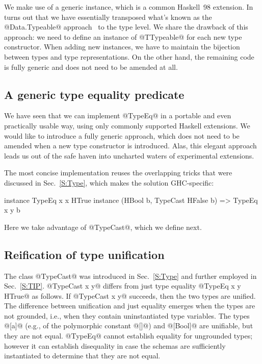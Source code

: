 \documentclass[nocopyrightspace,preprint]{sigplan-proc}
\newcommand{\hwVsTr}[2]{#2}
\begin{document}
We make use of a generic instance, which is a common Haskell~98
extension. In turns out that we have essentially transposed what's
known as the @Data.Typeable@ approach~\cite{LPJ03} to the type
level. We share the drawback of this approach: we need to define an
instance of @TTypeable@ for each new type constructor. When adding new
instances, we have to maintain the bijection between types and type
representations. On the other hand, the remaining code is fully generic
and does not need to be amended at all.


\medskip

\subsection*{A generic type equality predicate}

We have seen that we can implement @TypeEq@ in a portable and even
practically usable way, using only commonly supported Haskell
extensions. We would like to introduce a fully generic approach, which
does not need to be amended when a new type constructor is
introduced. Alas, this elegant approach leads us out of the safe haven
into uncharted waters of experimental extensions.

The most concise implementation reuses the overlapping tricks that
were discussed in Sec.~\ref{S:Type}, which makes the solution
GHC-specific:

\begin{code}
 instance TypeEq x x HTrue
 instance (HBool b, TypeCast HFalse b)
      =>  TypeEq x y b
\end{code}

Here we take advantage of @TypeCast@, which we define next.


\medskip

\subsection*{Reification of type unification}

The class @TypeCast@ was introduced in Sec.~\ref{S:Type} and further
employed in Sec.~\ref{S:TIP}. @TypeCast x y@ differs from just type
equality @TypeEq x y HTrue@ as follows. If @TypeCast x y@ succeeds,
then the two types are unified. The difference between unification and
just equality emerges when the types are not grounded, i.e., when they
contain uninstantiated type variables. The types @[a]@ (e.g., of the
polymorphic constant @[]@) and @[Bool]@ are unifiable, but they are
not equal. \hwVsTr{@TypeEq@ considers ungrounded types as schemas and
refuses to decide their equality.}{@TypeEq@ cannot establish equality
for ungrounded types; however it can establish disequality in case the
schemas are sufficiently instantiated to determine that they are not
equal.}
\end{document}
